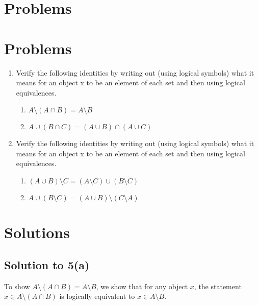 \documentclass{scrartcl}
\begin{document}
    \section*{Problems}

    \section*{Problems}

    \begin{enumerate}
        \item Verify the following identities by writing out (using logical symbols) what it means for an object x to be an element of each set and then using logical equivalences.
        \begin{enumerate}
            \item $A \setminus (A \cap B) = A \setminus B$
            \item $A \cup (B \cap C) = (A \cup B) \cap (A \cup C)$
        \end{enumerate}

        \item Verify the following identities by writing out (using logical symbols) what it means for an object x to be an element of each set and then using logical equivalences.
        \begin{enumerate}
            \item $(A \cup B) \setminus C = (A \setminus C) \cup (B \setminus C)$
            \item $A \cup (B \setminus C) = (A \cup B) \setminus (C \setminus A)$
        \end{enumerate}
    \end{enumerate}

    \section*{Solutions}

    \subsection*{Solution to 5(a)}
    To show $A \setminus (A \cap B) = A \setminus B$, we show that for any object $x$, the statement $x \in A \setminus (A \cap B)$ is logically equivalent to $x \in A \setminus B$.
\end{document}
